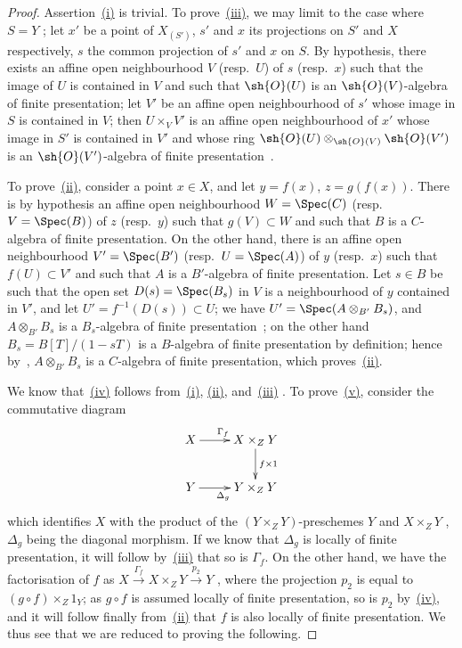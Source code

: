 \begin{proof}
Assertion~{\hyperlink{ega4.c04.prop.1-4-3}{(i)}} is trivial.
To prove~{\hyperlink{ega4.c04.prop.1-4-3}{(iii)}}, we may limit to the case where $S=Y$ ; let $x'$ be a point of $X_{(S')}$, $s'$ and $x$ its projections on $S'$ and $X$ respectively, $s$ the common projection of $s'$ and $x$ on $S$.
By hypothesis, there exists an affine open neighbourhood $V$ (resp.~$U$) of $s$ (resp.~$x$) such that the image of $U$ is contained in $V$ and such that $\sh{O}(U)$ is an $\sh{O}(V)$-algebra of finite presentation; let $V'$ be an affine open neighbourhood of $s'$ whose image in $S$ is contained in $V$; then $U\times_V V'$ is an affine open neighbourhood of $x'$ whose image in $S'$ is contained in $V'$ and whose ring $\sh{O}(U)\otimes_{\sh{O}(V)}\sh{O}(V')$ is an $\sh{O}(V')$-algebra of finite presentation~.

To prove~{\hyperlink{ega4.c04.prop.1-4-3}{(ii)}}, consider a point $x\in X$, and let $y=f(x)$, $z=g(f(x))$.
There is by hypothesis an affine open neighbourhood $W=\Spec(C)$ (resp.~$V=\Spec(B)$) of $z$ (resp.~$y$) such that $g(V)\subset W$ and such that $B$ is a $C$-algebra of finite presentation.
On the other hand, there is an affine open neighbourhood $V'=\Spec(B')$ (resp.~$U=\Spec(A)$) of $y$ (resp.~$x$) such that $f(U)\subset V'$ and such that $A$ is a $B'$-algebra of finite presentation.
Let $s\in B$ be such that the open set $D(s)=\Spec(B_s)$ in $V$ is a neighbourhood of $y$ contained in $V'$, and let $U'=f^{-1}(D(s))\subset U$; we have $U'=\Spec(A\otimes_{B'}B_s)$, and $A\otimes_{B'}B_s$ is a $B_s$-algebra of finite presentation~; on the other hand $B_s=B[T]/(1-sT)$ is a $B$-algebra of finite presentation by definition; hence by~, $A\otimes_{B'}B_s$ is a $C$-algebra of finite presentation, which proves~{\hyperlink{ega4.c04.prop.1-4-3}{(ii)}}.

We know that~{\hyperlink{ega4.c04.prop.1-4-3}{(iv)}} follows from~{\hyperlink{ega4.c04.prop.1-4-3}{(i)}}, {\hyperlink{ega4.c04.prop.1-4-3}{(ii)}}, and~{\hyperlink{ega4.c04.prop.1-4-3}{(iii)}} .
To prove~{\hyperlink{ega4.c04.prop.1-4-3}{(v)}}, consider the commutative diagram
\[
\xymatrix{
  X \ar[r]^{\Gamma_f} & X\times_Z Y \ar[d]^{f\times 1} \\
  Y \ar[r]_{\Delta_g} & Y\times_Z Y
}
\]
which identifies $X$ with the product of the $(Y\times_Z Y)$-preschemes $Y$ and $X\times_Z Y$ , $\Delta_g$ being the diagonal morphism.
If we know that $\Delta_g$ is locally of finite presentation, it will follow by~{\hyperlink{ega4.c04.prop.1-4-3}{(iii)}} that so is $\Gamma_f$.
On the other hand, we have the factorisation of $f$ as $X\xrightarrow{\Gamma_f} X\times_Z Y\xrightarrow{p_2} Y$ , where the projection $p_2$ is equal to $(g\circ f)\times_Z 1_Y$; as $g\circ f$ is assumed locally of finite presentation, so is $p_2$ by~{\hyperlink{ega4.c04.prop.1-4-3}{(iv)}}, and it will follow finally from~{\hyperlink{ega4.c04.prop.1-4-3}{(ii)}} that $f$ is also locally of finite presentation.
We thus see that we are reduced to proving the following.
\end{proof}

